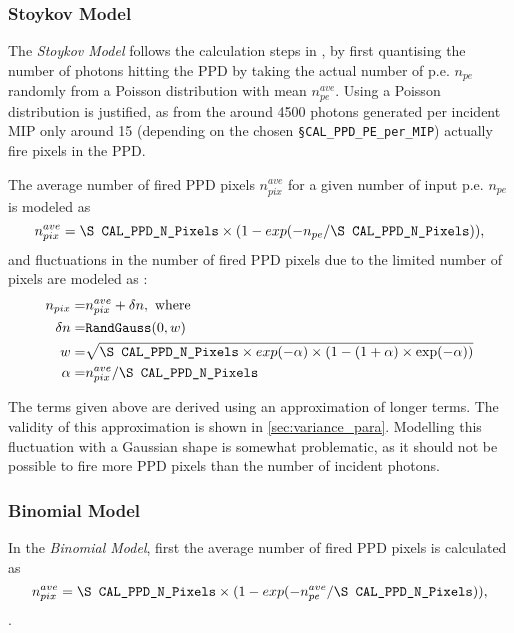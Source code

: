 \documentclass[12pt]{article} %
\begin{document}
\subsubsection*{Stoykov Model}
The \emph{Stoykov Model} follows the calculation steps in \cite{PPD}, by first quantising the number of photons hitting the PPD by taking the actual number of p.e. $n_{pe}$ randomly from a Poisson distribution with mean $n_{pe}^{ave}$. Using a Poisson distribution is justified, as from the around 4500 photons generated per incident MIP \cite{JGU_LA} only around 15 (depending on the chosen {\tt \S CAL\_PPD\_PE\_per\_MIP}) actually fire pixels in the PPD.

The average number of fired PPD pixels ${n}_{pix}^{ave}$ for a given number of input p.e. $n_{pe}$ is modeled as
\begin{equation*}
{n}_{pix}^{ave} = \text{\tt \S CAL\_PPD\_N\_Pixels} \times ( 1 - exp ( -n_{pe} / \text{\tt \S CAL\_PPD\_N\_Pixels}  ) ),
\end{equation*}
and fluctuations in the number of fired PPD pixels due to the limited number of pixels are modeled as \cite{PPD}:
\begin{equation*}
\begin{split}
n_{pix} = & {n}_{pix}^{ave} + \delta n, \text{ where} \\
\delta n = & \text{\tt RandGauss}( 0, w ) \\
       w = & \sqrt{\text{\tt \S CAL\_PPD\_N\_Pixels} \times exp(-\alpha) \times ( 1 - (1+\alpha) \times \exp ( - \alpha ) ) } \\
       \alpha = & n_{pix}^{ave} / \text{\tt \S CAL\_PPD\_N\_Pixels}
\end{split}
\end{equation*}

The terms given above are derived using an approximation of longer terms. The validity of this approximation is shown in \ref{sec:variance_para}.
Modelling this fluctuation with a Gaussian shape is somewhat problematic, as it should not be possible to fire more PPD pixels than the number of incident photons.

\subsubsection*{Binomial Model}
In the \emph{Binomial Model}, first the average number of fired PPD pixels is calculated as
\begin{equation*}
{n}_{pix}^{ave} = \text{\tt \S CAL\_PPD\_N\_Pixels} \times ( 1 - exp ( -n_{pe}^{ave} / \text{\tt \S CAL\_PPD\_N\_Pixels}  ) ),
\end{equation*}.
\end{document}
